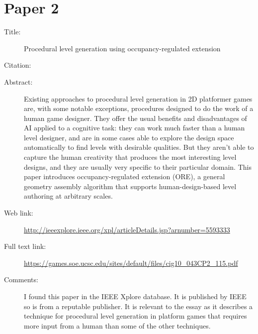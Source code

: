\documentclass{scrartcl}
\begin{document}
\section*{Paper 2}
\begin{description}
\item[Title:] Procedural level generation using occupancy-regulated extension
\item[Citation:] \cite{mawhorter:occupancy}
\item[Abstract:] Existing approaches to procedural level generation in 2D platformer games are, with some notable exceptions, procedures designed to do the work of a human game designer. They offer the usual benefits and disadvantages of AI applied to a cognitive task: they can work much faster than a human level designer, and are in some cases able to explore the design space automatically to find levels with desirable qualities. But they aren't able to capture the human creativity that produces the most interesting level designs, and they are usually very specific to their particular domain. This paper introduces occupancy-regulated extension (ORE), a general geometry assembly algorithm that supports human-design-based level authoring at arbitrary scales.
\item[Web link:] \url{http://ieeexplore.ieee.org/xpl/articleDetails.jsp?arnumber=5593333}
\item[Full text link:] \url{https://games.soe.ucsc.edu/sites/default/files/cig10_043CP2_115.pdf}
\item[Comments:] I found this paper in the IEEE Xplore database. It is published by IEEE so is from a reputable publisher. It is relevant to the essay as it describes a technique for procedural level generation in platform games that requires more input from a human than some of the other techniques.
\end{description}
\end{document}
